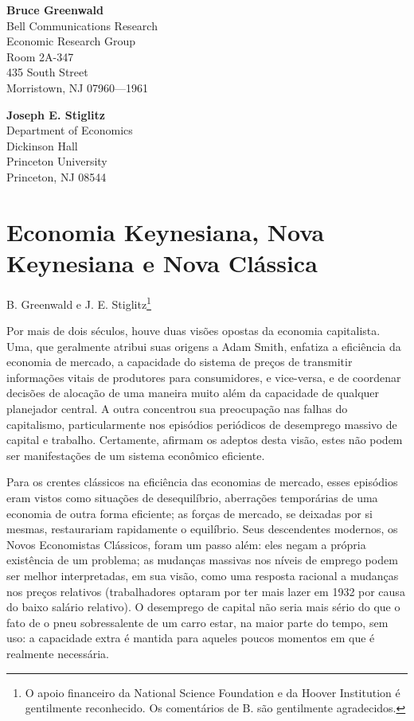 \documentclass[12pt]{article}
\begin{document}
\noindent
\textbf{Bruce Greenwald} \\
Bell Communications Research \\
Economic Research Group \\
Room 2A-347 \\
435 South Street \\
Morristown, NJ 07960—1961

\vspace{0.5cm}

\noindent
\textbf{Joseph E. Stiglitz} \\
Department of Economics \\
Dickinson Hall \\
Princeton University \\
Princeton, NJ 08544

\newpage

\section*{Economia Keynesiana, Nova Keynesiana e Nova Clássica}
\begin{center}
    B. Greenwald e J. E. Stiglitz\footnote{O apoio financeiro da National Science Foundation e da Hoover Institution é gentilmente reconhecido. Os comentários de B. são gentilmente agradecidos.}
\end{center}

Por mais de dois séculos, houve duas visões opostas da economia capitalista. Uma, que geralmente atribui suas origens a Adam Smith, enfatiza a eficiência da economia de mercado, a capacidade do sistema de preços de transmitir informações vitais de produtores para consumidores, e vice-versa, e de coordenar decisões de alocação de uma maneira muito além da capacidade de qualquer planejador central. A outra concentrou sua preocupação nas falhas do capitalismo, particularmente nos episódios periódicos de desemprego massivo de capital e trabalho. Certamente, afirmam os adeptos desta visão, estes não podem ser manifestações de um sistema econômico eficiente.

Para os crentes clássicos na eficiência das economias de mercado, esses episódios eram vistos como situações de desequilíbrio, aberrações temporárias de uma economia de outra forma eficiente; as forças de mercado, se deixadas por si mesmas, restaurariam rapidamente o equilíbrio. Seus descendentes modernos, os Novos Economistas Clássicos, foram um passo além: eles negam a própria existência de um problema; as mudanças massivas nos níveis de emprego podem ser melhor interpretadas, em sua visão, como uma resposta racional a mudanças nos preços relativos (trabalhadores optaram por ter mais lazer em 1932 por causa do baixo salário relativo). O desemprego de capital não seria mais sério do que o fato de o pneu sobressalente de um carro estar, na maior parte do tempo, sem uso: a capacidade extra é mantida para aqueles poucos momentos em que é realmente necessária.
\end{document}
